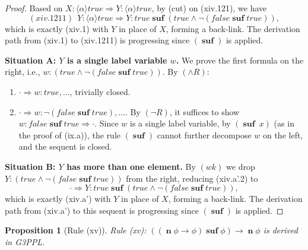 \documentclass[manuscript,screen]{acmart}
\newtheorem{prop}{Proposition}[section]
\newcommand{\la}[0]{\langle}
\newcommand{\ra}[0]{\rangle}
\newcommand{\true}[0]{\mathit{true}}
\newcommand{\false}[0]{\mathit{false}}
\newcommand{\GiiiPPLcyc}[0]{\mbox{G3PPL}}
\DeclareMathOperator{\osuf}{\mathbf{suf}}
\DeclareMathOperator{\nxt}{\mathbf{n}}
\begin{document}
\begin{proof}
Based on $X : \la\alpha\ra\true\Rightarrow Y : \la\alpha\ra \true$, by (cut) on (xiv.121), we have
$$
(xiv.1211)\ \ Y : \la\alpha\ra\true\Rightarrow Y : \true\osuf(\true\wedge\neg(\false\osuf\true)), 
$$
which is exactly (xiv.1) with $Y$ in place of $X$, forming a back-link. The derivation path from (xiv.1) to (xiv.1211) is progressing since $(\osuf)$ is applied.
\fi


\ifx
\textbf{Situation A: $Y$ is a single label variable $w$.} We prove the first formula on the right, i.e., $w : (\true\wedge\neg(\false\osuf\true))$. By $(\wedge R)$:
\begin{enumerate}
    \item[(xiv.a'.2.A.1)] $\cdot\Rightarrow w : \true, \ldots$, trivially closed.
    \item[(xiv.a'.2.A.2)] $\cdot\Rightarrow w : \neg(\false\osuf\true), \ldots$. By $(\neg R)$, it suffices to show $w : \false\osuf\true\Rightarrow \cdot$. Since $w$ is a single label variable, by $(\osuf\ x)$ (as in the proof of (ix.a)), the rule $(\osuf)$ cannot further decompose $w$ on the left, and the sequent is closed.
\end{enumerate}

\textbf{Situation B: $Y$ has more than one element.} By $(wk)$ we drop $Y : (\true\wedge\neg(\false\osuf\true))$ from the right, reducing (xiv.a'.2) to
$$
\cdot\Rightarrow Y : \true\osuf(\true\wedge\neg(\false\osuf\true)),
$$
which is exactly (xiv.a') with $Y$ in place of $X$, forming a back-link. The derivation path from (xiv.a') to this sequent is progressing since $(\osuf)$ is applied.
\fi

\end{proof}

\ifx
\begin{prop}[Rule (xv)]
    \label{prop:Rule (xv)}
Rule (xv): 
$((\nxt \phi\to \phi)\osuf \phi) \rightarrow \nxt \phi$
is derived in \GiiiPPLcyc. 
\end{prop}
\end{document}
